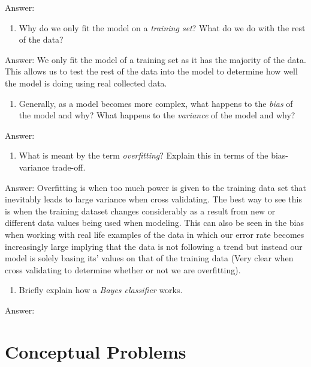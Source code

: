 \documentclass[
]{article}
\providecommand{\tightlist}{%
  \setlength{\itemsep}{0pt}\setlength{\parskip}{0pt}}
\begin{document}
Answer:

\begin{enumerate}
\def\labelenumi{\arabic{enumi}.}
\setcounter{enumi}{6}
\tightlist
\item
  Why do we only fit the model on a \emph{training set}? What do we do
  with the rest of the data?
\end{enumerate}

Answer: We only fit the model of a training set as it has the majority
of the data. This allows us to test the rest of the data into the model
to determine how well the model is doing using real collected data.

\begin{enumerate}
\def\labelenumi{\arabic{enumi}.}
\setcounter{enumi}{7}
\tightlist
\item
  Generally, as a model becomes more complex, what happens to the
  \emph{bias} of the model and why? What happens to the \emph{variance}
  of the model and why?
\end{enumerate}

Answer:

\begin{enumerate}
\def\labelenumi{\arabic{enumi}.}
\setcounter{enumi}{8}
\tightlist
\item
  What is meant by the term \emph{overfitting}? Explain this in terms of
  the bias-variance trade-off.
\end{enumerate}

Answer: Overfitting is when too much power is given to the training data
set that inevitably leads to large variance when cross validating. The
best way to see this is when the training dataset changes considerably
as a result from new or different data values being used when modeling.
This can also be seen in the bias when working with real life examples
of the data in which our error rate becomes increasingly large implying
that the data is not following a trend but instead our model is solely
basing its' values on that of the training data (Very clear when cross
validating to determine whether or not we are overfitting).

\begin{enumerate}
\def\labelenumi{\arabic{enumi}.}
\setcounter{enumi}{9}
\tightlist
\item
  Briefly explain how a \emph{Bayes classifier} works.
\end{enumerate}

Answer:

\hypertarget{conceptual-problems}{%
\section{Conceptual Problems}\label{conceptual-problems}}
\end{document}
